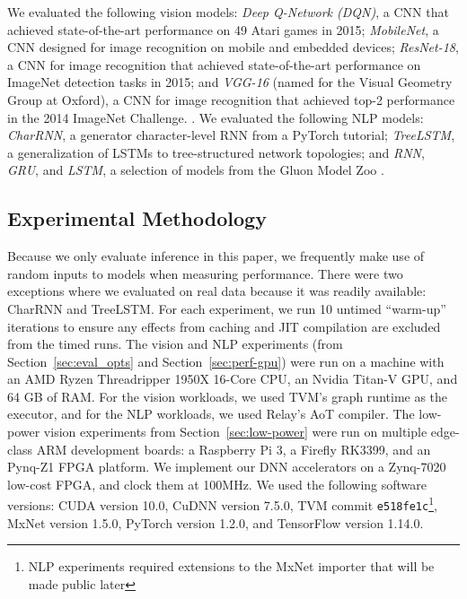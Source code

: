 We evaluated the following vision models:
  \textit{Deep Q-Network (DQN)}, a CNN that achieved state-of-the-art performance
  on 49 Atari games in 2015;
  \textit{MobileNet}, a CNN designed for image recognition on mobile and
  embedded devices;
  \textit{ResNet-18}, a CNN for image recognition that achieved state-of-the-art
  performance on ImageNet detection tasks in 2015;
  and \textit{VGG-16} (named for the Visual Geometry Group at Oxford),
    a CNN for image recognition that achieved top-2 performance in the 2014 ImageNet Challenge.
  \citep{dqn, mobilenet, resnet, vgg}.
We evaluated the following NLP models:
  \textit{CharRNN}, a generator character-level
  RNN from a PyTorch tutorial;
  \textit{TreeLSTM}, a generalization of LSTMs to
  tree-structured network topologies;
  and \textit{RNN}, \textit{GRU}, and \textit{LSTM}, a selection of models from the Gluon
  Model Zoo
  \citep{pytorch_rnn_tut, tree_lstm, gluon_model_zoo}.

\subsection{Experimental Methodology}
Because we only evaluate inference in this paper,
  we frequently make use of random inputs to models when measuring
  performance.
There were two exceptions where we evaluated on real data because
  it was readily available: CharRNN and TreeLSTM.
For each experiment,
  we run 10 untimed ``warm-up'' iterations to ensure any effects from caching and
  JIT compilation are excluded from the timed runs.
The vision and NLP experiments (from Section~\ref{sec:eval_opts} and Section~\ref{sec:perf-gpu})
  were run on a machine with an AMD Ryzen Threadripper 1950X 16-Core CPU,
  an Nvidia Titan-V GPU,
  and 64 GB of RAM.
For the vision workloads,
  we used TVM's graph runtime as the executor,
  and for the NLP workloads,
  we used Relay's AoT compiler.
The low-power vision experiments from Section~\ref{sec:low-power} were run on multiple edge-class ARM development boards: a Raspberry Pi 3, a Firefly RK3399, and an Pynq-Z1 FPGA platform.
We implement our DNN accelerators on a Zynq-7020 low-cost FPGA, and clock them at 100MHz.
We used the following software versions:
  CUDA version 10.0,
  CuDNN version 7.5.0,
  TVM commit \texttt{e518fe1c}\footnote{NLP experiments required extensions to the MxNet importer that will be made public later},
  MxNet version 1.5.0,
  PyTorch version 1.2.0,
  and TensorFlow version 1.14.0.

